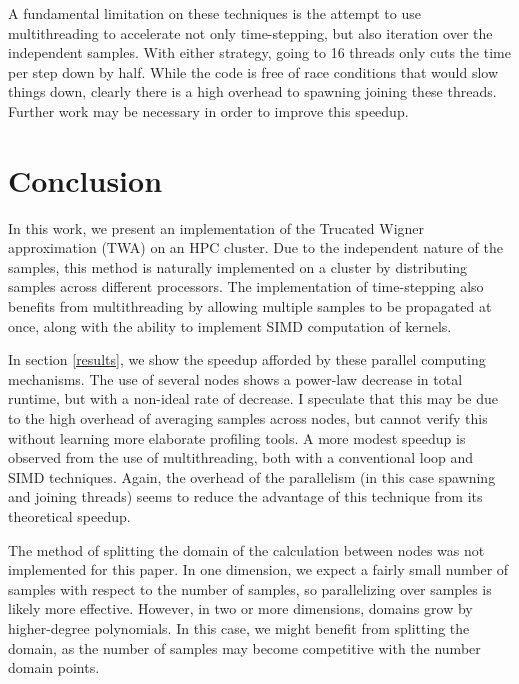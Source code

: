 \documentclass{article}
\begin{document}
A fundamental limitation on these techniques is the attempt to use multithreading to accelerate not only time-stepping,
but also iteration over the independent samples. With either strategy, going to 16 threads only cuts the time per step 
down by half. While the code is free of race conditions that would slow things down, clearly there is a high overhead 
to spawning joining these threads. Further work may be necessary in order to improve this speedup.

\section{Conclusion} \label{conclusion}

In this work, we present an implementation of the Trucated Wigner approximation (TWA) on an HPC cluster.
Due to the independent nature of the samples, this method is naturally implemented on a cluster by 
distributing samples across different processors. The implementation of time-stepping also benefits from 
multithreading by allowing multiple samples to be propagated at once, along with the ability to 
implement SIMD computation of kernels.

In section \ref{results}, we show the speedup afforded by these parallel computing mechanisms. 
The use of several nodes shows a power-law decrease in total runtime, but with a non-ideal 
rate of decrease. I speculate that this may be due to the high overhead of averaging samples across nodes, 
but cannot verify this without learning more elaborate profiling tools. A more modest speedup is observed 
from the use of multithreading, both with a conventional loop and SIMD techniques. Again, the overhead of 
the parallelism (in this case spawning and joining threads) seems to reduce the advantage of this technique
from its theoretical speedup. 

The method of splitting the domain of the calculation between nodes was not implemented for this paper. 
In one dimension, we expect a fairly small number of samples with respect to the number of samples, 
so parallelizing over samples is likely more effective. However, in two or more dimensions, domains grow
by higher-degree polynomials. In this case, we might benefit from splitting the domain, as the number of 
samples may become competitive with the number domain points.
\end{document}
